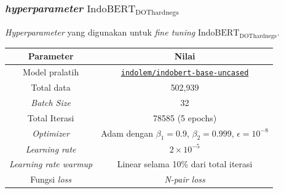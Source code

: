 \documentclass[10pt]{beamer}
\newcommand{\f}[1]{\textit{#1}}
\newcommand{\code}[1]{\texttt{#1}}
\begin{document}
\begin{frame}
    \frametitle{\f{hyperparameter} $\text{IndoBERT}_{\text{DOThardnegs}}$}
    \f{Hyperparameter} yang digunakan untuk \f{fine tuning }$\text{IndoBERT}_{\text{DOThardnegs}}$.
    \begin{table}[!ht]
        \centering
        \small

        \label{tab:indobert-dothardnegs-hyperparameter}
        \begin{tabular}{|c|c|}
            \hline
            \textbf{Parameter}       & \textbf{Nilai}                                                                                    \\
            \hline
            Model pralatih           & \href{https://huggingface.co/indolem/indobert-base-uncased}{\code{indolem/indobert-base-uncased}} \\
            \hline
            Total data               & 502,939                                                                                           \\
            \hline
            \f{Batch Size}           & 32                                                                                                \\
            \hline
            Total Iterasi            & 78585 (5 epochs)                                                                                  \\
            \hline
            \f{Optimizer}            & Adam dengan $\beta_1 = 0.9$, $\beta_2 = 0.999$, $\epsilon = 10^{-8}$                                 \\
            \hline
            \f{Learning rate}        & $2\times 10^{-5}$                                                                                              \\
            \hline
            \f{Learning rate warmup} & Linear selama 10\% dari total iterasi                                                             \\
            \hline
            Fungsi \f{loss}          & \f{N-pair loss}                                                                                   \\
            \hline
        \end{tabular}
    \end{table}    
\end{frame}
\end{document}
